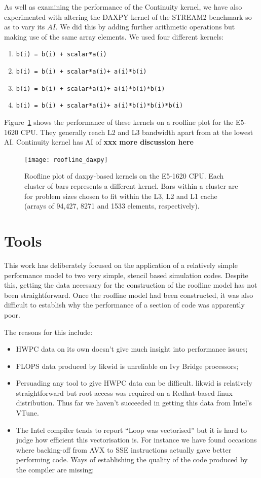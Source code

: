 \documentclass[12pt]{article}
\begin{document}
As well as examining the performance of the Continuity kernel, we have
also experimented with altering the DAXPY kernel of the STREAM2
benchmark so as to vary its $AI$. We did this by adding further
arithmetic operations but making use of the same array
elements. We used four different kernels:
\begin{enumerate}
\item {\tt b(i) = b(i) + scalar*a(i)}
\item {\tt b(i) = b(i) + scalar*a(i)+ a(i)*b(i)}
\item {\tt b(i) = b(i) + scalar*a(i)+ a(i)*b(i)*b(i)}
\item {\tt b(i) = b(i) + scalar*a(i)+ a(i)*b(i)*b(i)*b(i)}
\end{enumerate}
Figure~\ref{FIG_daxpy_roofline} shows the performance of these kernels
on a roofline plot for the E5-1620 CPU. They generally reach L2 and L3
bandwidth apart from at the lowest AI. Continuity kernel has AI of
{\bf xxx more discussion here}

\begin{figure}
\texttt{[image: roofline\_daxpy]}
\caption{Roofline plot of daxpy-based kernels on the E5-1620 CPU. Each
  cluster of bars represents a different kernel. Bars within a cluster
  are for problem sizes chosen to fit within the L3, L2 and L1 cache
  (arrays of 94,427, 8271 and 1533 elements, respectively). }
\label{FIG_daxpy_roofline}
\end{figure}

\section{Tools}

This work has deliberately focused on the application of a relatively
simple performance model to two very simple, stencil based simulation
codes.  Despite this, getting the data necessary for the construction
of the roofline model has not been straightforward. Once the roofline
model had been constructed, it was also difficult to establish why the
performance of a section of code was apparently poor.

The reasons for this include:
\begin{itemize}
\item HWPC data on its own doesn't give much insight into performance issues;
\item FLOPS data produced by likwid is unreliable on Ivy Bridge processors;
\item Persuading any tool to give HWPC data can be difficult. likwid
  is relatively straightforward but root access was required on a
  Redhat-based linux distribution. Thus far we haven't succeeded in
  getting this data from Intel's VTune.
\item The Intel compiler tends to report ``Loop was vectorised'' but
  it is hard to judge how efficient this vectorisation is. For
  instance we have found occasions where backing-off from AVX to SSE
  instructions actually gave better performing code. Ways of
  establishing the quality of the code produced by the compiler are
  missing;
\end{itemize}
\end{document}
